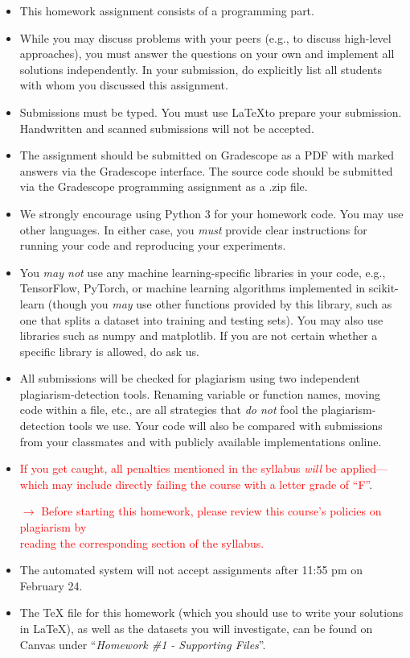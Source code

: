 \documentclass{article}
\begin{document}
\begin{itemize}
    \item This homework assignment consists of a programming part. 
    \item While you may discuss problems with your peers (e.g., to discuss high-level approaches), you must answer the questions on your own and implement all solutions independently. In your submission, do explicitly list all students with whom you discussed this assignment. 
    \item Submissions must be typed. You must use \LaTeX to prepare your submission. Handwritten and scanned submissions will not be accepted. 
    \item The assignment should be submitted on Gradescope as a PDF with marked answers via the Gradescope interface. The source code should be submitted via the Gradescope programming assignment as a .zip file. 
    \item We strongly encourage using Python 3 for your homework code. You may use other languages. In either case, you \textit{must} provide clear instructions for running your code and reproducing your experiments. 
    \item You \textit{may not} use any machine learning-specific libraries in your code, e.g., TensorFlow, PyTorch, or machine learning algorithms implemented in scikit-learn (though you \textit{may} use other functions provided by this library, such as one that splits a dataset into training and testing sets). You may also use libraries such as numpy and matplotlib. If you are not certain whether a specific library is allowed, do ask us.
    \item All submissions will be checked for plagiarism using two independent plagiarism-detection tools. Renaming variable or function names, moving code within a file, etc., are all strategies that \textit{do not} fool the plagiarism-detection tools we use. Your code will also be compared with submissions from your classmates and with publicly available implementations online. 
    \item \textcolor{red}{If you get caught, all penalties mentioned in the syllabus \textit{will} be applied---which may include directly failing the course with a letter grade of ``F''}.
    \begin{center}
        \textcolor{red}{$\rightarrow$ Before starting this homework, please review this course's policies on plagiarism by  \\reading the corresponding section of the syllabus.}
    \end{center}
    \item The automated system will not accept assignments after 11:55 pm on February 24. 
    \item The TeX file for this homework (which you should use to write your solutions in \LaTeX), as well as the datasets you will investigate, can be found on Canvas under ``\textit{Homework \#1 - Supporting Files}''. 
\end{itemize}
\end{document}
